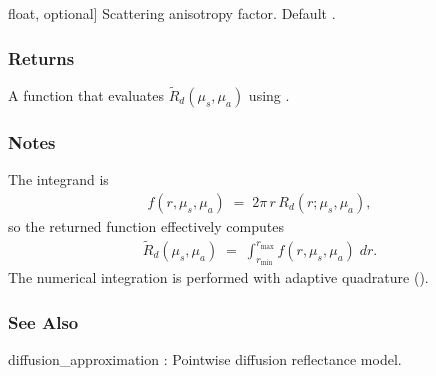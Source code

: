 \documentclass[letterpaper,10pt,english]{sphinxmanual}
\begin{document}
\begin{fulllineitems}
\begin{description}
\sphinxlineitem{g}{[}float, optional{]}
\sphinxAtStartPar
Scattering anisotropy factor. Default .

\end{description}


\subsubsection{Returns}
\label{\detokenize{generated/photon_canon.contrib.diffusion_theory:returns}}\begin{description}
\sphinxAtStartPar
A function  that evaluates
\(\tilde{R}_d(\mu_s,\mu_a)\) using
.

\end{description}


\subsubsection{Notes}
\label{\detokenize{generated/photon_canon.contrib.diffusion_theory:notes}}
\sphinxAtStartPar
The integrand is
\begin{equation*}
\begin{split}f(r,\mu_s,\mu_a)
\;=\;
2\pi\,r\,R_d(r;\mu_s,\mu_a),\end{split}
\end{equation*}
\sphinxAtStartPar
so the returned function effectively computes
\begin{equation*}
\begin{split}\tilde{R}_d(\mu_s,\mu_a)
\;=\;
\int_{r_{\min}}^{r_{\max}} f(r,\mu_s,\mu_a)\;dr.\end{split}
\end{equation*}
\sphinxAtStartPar
The numerical integration is performed with adaptive quadrature
().


\subsubsection{See Also}
\label{\detokenize{generated/photon_canon.contrib.diffusion_theory:see-also}}
\sphinxAtStartPar
diffusion\_approximation : Point\sphinxhyphen{}wise diffusion reflectance model.



\end{fulllineitems}
\end{document}
